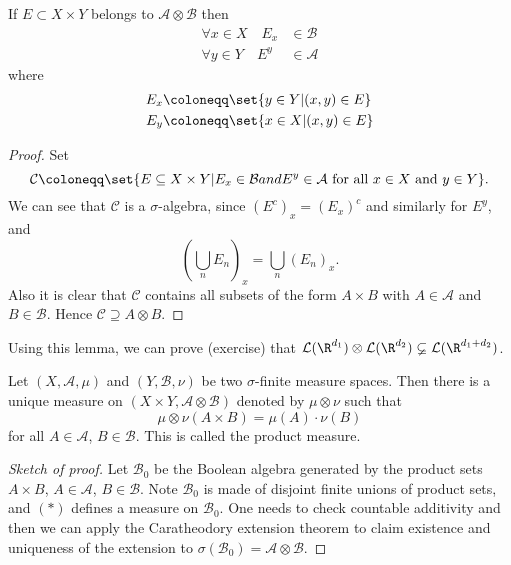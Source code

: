 \documentclass{article}
\newcommand{\1}[1]{\mathbbm{1}_{#1}}
\begin{document}
\begin{lemma}
    If $E \subset X \times Y$ belongs to $\mathcal{A} \otimes \mathcal{B}$ then
    \begin{align*}
        \forall x \in X \quad E_x &\in \mathcal{B} \\
        \forall y \in Y \quad E^y &\in \mathcal{A}
    \end{align*}
    where
    \begin{align*}
        E_x &\coloneqq \set{y \in Y | (x, y) \in E} \\
        E_y &\coloneqq \set{x \in X | (x, y) \in E}
    \end{align*}
\end{lemma}

\begin{proof}
    Set
    \begin{equation*}
        \mathcal{C} \coloneqq \set{E \subseteq X \times Y | E_x \in \mathcal{B} and E^y \in \mathcal{A} \text{ for all } x \in X \text{ and } y \in Y}.
    \end{equation*}
    We can see that $\mathcal{C}$ is a $\sigma$-algebra, since $(E^c)_x = (E_x)^c$ and similarly for $E^y$, and
    \begin{equation*}
        (\bigcup_n E_n)_x = \bigcup_n (E_n)_x.
    \end{equation*}
    Also it is clear that $\mathcal{C}$ contains all subsets of the form $A \times B$ with $A \in \mathcal{A}$ and $B \in \mathcal{B}$.
    Hence $\mathcal{C} \supseteq A \otimes B$.
\end{proof}

Using this lemma, we can prove (exercise) that $\mathcal{L}(\R^{d_1}) \otimes \mathcal{L}(\R^{d_2}) \varsubsetneq \mathcal{L}(\R^{d_1 + d_2})$.

\begin{prop}
    Let $(X, \mathcal{A}, \mu)$ and $(Y, \mathcal{B}, \nu)$ be two $\sigma$-finite measure spaces.
    Then there is a unique measure on $(X \times Y, \mathcal{A} \otimes \mathcal{B})$ denoted by $\mu \otimes \nu$ such that
    \begin{equation*}
        \mu \otimes \nu (A \times B) = \mu(A) \cdot \nu(B) \tag{$*$}
    \end{equation*}
    for all $A \in \mathcal{A}$, $B \in \mathcal{B}$.
    This is called the product measure.
\end{prop}

\begin{proof}[Sketch of proof]
    Let $\mathcal{B}_0$ be the Boolean algebra generated by the product sets $A \times B$, $A \in \mathcal{A}$, $B \in \mathcal{B}$.
    Note $\mathcal{B}_0$ is made of disjoint finite unions of product sets, and $(*)$ defines a measure on $\mathcal{B_0}$.
    One needs to check countable additivity and then we can apply the Caratheodory extension theorem to claim existence and uniqueness of the extension to $\sigma(\mathcal{B_0}) = \mathcal{A} \otimes \mathcal{B}$.
\end{proof}
\end{document}
